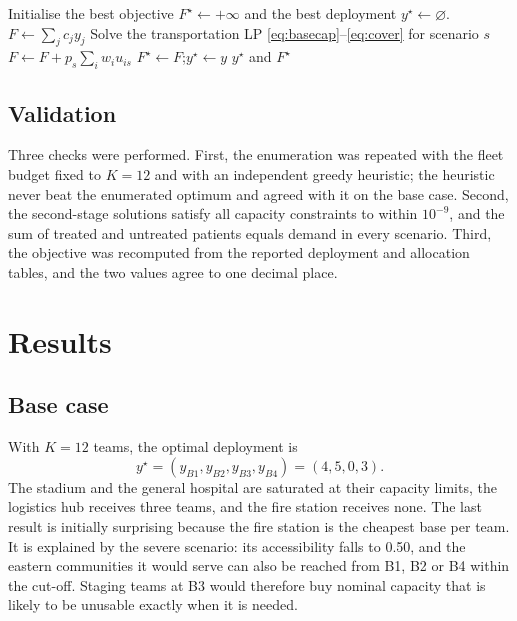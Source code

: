 \documentclass{apmcmthesis}
\begin{document}
\begin{algorithm}[H]
\caption{Exact solution of the two-stage model}
\label{alg:enum}
\begin{algorithmic}[1]
\State Initialise the best objective $F^{\star}\gets +\infty$ and the best deployment $y^{\star}\gets \varnothing$.
  \State $F\gets \sum_j c_j y_j$
    \State Solve the transportation LP \eqref{eq:basecap}--\eqref{eq:cover} for scenario $s$
    \State $F\gets F + p_s \sum_i w_i u_{is}$
  \EndFor
    \State $F^{\star}\gets F$;\quad $y^{\star}\gets y$
  \EndIf
\EndFor
\State \Return $y^{\star}$ and $F^{\star}$
\end{algorithmic}
\end{algorithm}

\subsection{Validation}

Three checks were performed. First, the enumeration was repeated with the fleet budget fixed to $K=12$ and with an independent greedy heuristic; the heuristic never beat the enumerated optimum and agreed with it on the base case. Second, the second-stage solutions satisfy all capacity constraints to within $10^{-9}$, and the sum of treated and untreated patients equals demand in every scenario. Third, the objective was recomputed from the reported deployment and allocation tables, and the two values agree to one decimal place.

\section{Results}

\subsection{Base case}

With $K=12$ teams, the optimal deployment is
\[
y^{\star}=(y_{B1},y_{B2},y_{B3},y_{B4})=(4,5,0,3).
\]
The stadium and the general hospital are saturated at their capacity limits, the logistics hub receives three teams, and the fire station receives none. The last result is initially surprising because the fire station is the cheapest base per team. It is explained by the severe scenario: its accessibility falls to 0.50, and the eastern communities it would serve can also be reached from B1, B2 or B4 within the cut-off. Staging teams at B3 would therefore buy nominal capacity that is likely to be unusable exactly when it is needed.
\end{document}
